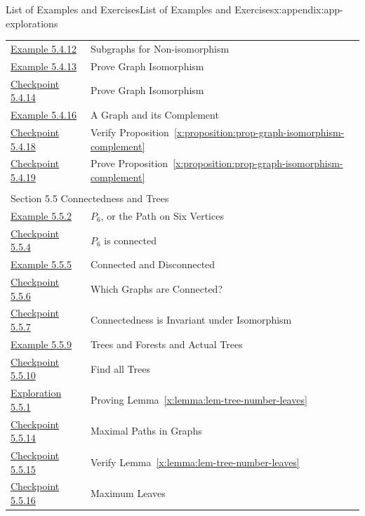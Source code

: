\documentclass[oneside,10pt,]{book}
\newcommand{\xreffont}{\relax}
\numberwithin{equation}{section}
\begin{document}
\begin{appendixptx}{List of Examples and Exercises}{}{List of Examples and Exercises}{}{}{x:appendix:app-explorations}
\begin{longtable}[l]{ll}
\hyperref[x:example:eg-subgraph-not-isomorphic]{Example 5.4.12}& Subgraphs for Non-isomorphism\\
\hyperref[x:example:eg-graph-construct-isomorphism]{Example 5.4.13}& Prove Graph Isomorphism\\
\hyperref[x:exercise:ex-graph-prove-isomorphic]{Checkpoint 5.4.14}& Prove Graph Isomorphism\\
\hyperref[x:example:eg-graph-complement]{Example 5.4.16}& A Graph and its Complement\\
\hyperref[x:exercise:ex-graph-isomorphism-complement]{Checkpoint 5.4.18}& Verify Proposition~{\xreffont\ref*{x:proposition:prop-graph-isomorphism-complement}}\\
\hyperref[x:exercise:ex-graph-prove-complement]{Checkpoint 5.4.19}& Prove Proposition~{\xreffont\ref*{x:proposition:prop-graph-isomorphism-complement}}\\
\multicolumn{2}{l}{\null}\\[1.5ex] \multicolumn{2}{l}{\large Section 5.5 Connectedness and Trees}\\[0.5ex]
\hyperref[x:example:eg-path-graph]{Example 5.5.2}& \(P_6\), or the Path on Six Vertices\\
\hyperref[x:exercise:ex-path-connected]{Checkpoint 5.5.4}& \(P_6\) is connected\\
\hyperref[x:example:eg-graph-connected-component]{Example 5.5.5}& Connected and Disconnected\\
\hyperref[x:exercise:ex-which-connected]{Checkpoint 5.5.6}& Which Graphs are Connected?\\
\hyperref[x:exercise:ex-isomorphic-connected]{Checkpoint 5.5.7}& Connectedness is Invariant under Isomorphism\\
\hyperref[x:example:eg-tree-forest]{Example 5.5.9}& Trees and Forests and Actual Trees\\
\hyperref[x:exercise:ex-nonisomorphic-trees]{Checkpoint 5.5.10}& Find all Trees\\
\hyperref[x:exploration:expl-tree-number-leaves]{Exploration 5.5.1}& Proving Lemma~{\xreffont\ref*{x:lemma:lem-tree-number-leaves}}\\
\hyperref[x:exercise:ex-maximal-paths]{Checkpoint 5.5.14}& Maximal Paths in Graphs\\
\hyperref[x:exercise:ex-verify-lemma-leaves]{Checkpoint 5.5.15}& Verify Lemma~{\xreffont\ref*{x:lemma:lem-tree-number-leaves}}\\
\hyperref[x:exercise:ex-max-leaves]{Checkpoint 5.5.16}& Maximum Leaves\\

\end{longtable}
\end{appendixptx}
\end{document}
